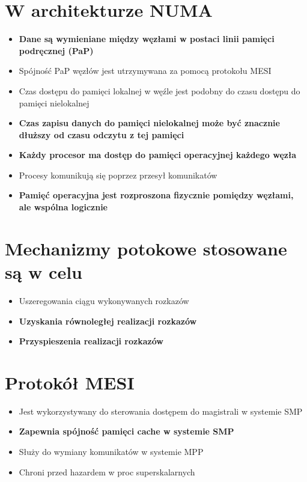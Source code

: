 \documentclass[a4paper,twoside]{article}
\begin{document}
\section{W architekturze NUMA}
	\begin{itemize}
    \item \textbf{Dane są wymieniane między węzłami w postaci linii pamięci podręcznej (PaP)}
    \item Spójność PaP węzłów jest utrzymywana za pomocą protokołu MESI
    \item Czas dostępu do pamięci lokalnej w węźle jest podobny do czasu dostępu do pamięci nielokalnej
    \item \textbf{Czas zapisu danych do pamięci nielokalnej może być znacznie dłuższy od czasu odczytu z tej pamięci}
    \item \textbf{Każdy procesor ma dostęp do pamięci operacyjnej każdego węzła}
    \item Procesy komunikują się poprzez przesył komunikatów
    \item \textbf{Pamięć operacyjna jest rozproszona fizycznie pomiędzy węzłami, ale wspólna logicznie}
    \end{itemize}

\section{Mechanizmy potokowe stosowane są w celu}
	\begin{itemize}
    \item Uszeregowania ciągu wykonywanych rozkazów
    \item \textbf{Uzyskania równoległej realizacji rozkazów}
    \item \textbf{Przyspieszenia realizacji rozkazów}
    \end{itemize}

\section{Protokół MESI}
	\begin{itemize}
    \item Jest wykorzystywany do sterowania dostępem do magistrali w systemie SMP
    \item \textbf{Zapewnia spójność pamięci cache w systemie SMP}
    \item Służy do wymiany komunikatów w systemie MPP
    \item Chroni przed hazardem w proc superskalarnych
    \end{itemize}
    
\end{document}
